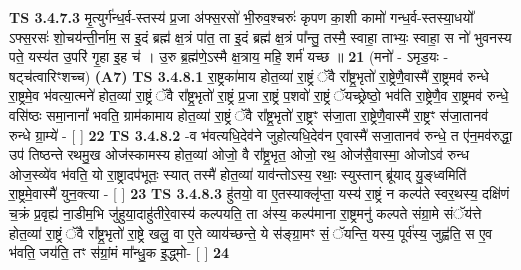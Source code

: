 \documentclass[17pt]{extarticle}
\begin{document}
                  \newline
                                \textbf{ TS 3.4.7.3} \newline
                  मृ॒त्युर्ग॑न्ध॒र्व-स्तस्य॑ प्र॒जा अ॑फ्स॒रसो॑ भी॒रुव॒श्चरुः॑ कृपण का॒शी कामो॑ गन्ध॒र्व-स्तस्या॒धयो᳚ ऽफ्स॒रसः॑ शो॒चय॑न्ती॒र्नाम॒ स इ॒दं ब्रह्म॑ क्ष॒त्रं पा॑त॒ ता इ॒दं ब्रह्म॑ क्ष॒त्रं पा᳚न्तु॒ तस्मै॒ स्वाहा॒ ताभ्यः॒ स्वाहा॒ स नो॑ भुवनस्य पते॒ यस्य॑त उ॒परि॑ गृ॒हा इ॒ह च॑ । उ॒रु ब्र॒ह्म॑णे॒ऽस्मै क्ष॒त्राय॒ महि॒ शर्म॑ यच्छ ॥ \textbf{  21} \newline
                  \newline
                      (मनो॑ - ऽमृड॒यः - षट्च॑त्वारिꣳशच्च)  \textbf{(A7)} \newline \newline
                                        \textbf{ TS 3.4.8.1} \newline
                  रा॒ष्ट्रका॑माय होत॒व्या॑ रा॒ष्ट्रं ॅवै रा᳚ष्ट्र॒भृतो॑ रा॒ष्ट्रेणै॒वास्मै॑ रा॒ष्ट्रमव॑ रुन्धे रा॒ष्ट्रमे॒व भ॑वत्या॒त्मने॑ होत॒व्या॑ रा॒ष्ट्रं ॅवै रा᳚ष्ट्र॒भृतो॑ रा॒ष्ट्रं प्र॒जा रा॒ष्ट्रं प॒शवो॑ रा॒ष्ट्रं ॅयच्छ्रेष्ठो॒ भव॑ति रा॒ष्ट्रेणै॒व रा॒ष्ट्रमव॑ रुन्धे॒ वसि॑ष्ठः समा॒नानां᳚ भवति॒ ग्राम॑कामाय होत॒व्या॑ रा॒ष्ट्रं ॅवै रा᳚ष्ट्र॒भृतो॑ रा॒ष्ट्रꣳ स॑जा॒ता रा॒ष्ट्रेणै॒वास्मै॑ रा॒ष्ट्रꣳ स॑जा॒तानव॑ रुन्धे ग्रा॒म्ये॑ - [  ] \textbf{  22} \newline
                  \newline
                                \textbf{ TS 3.4.8.2} \newline
                  -व भ॑वत्यधि॒देव॑ने जुहोत्यधि॒देव॑न ए॒वास्मै॑ सजा॒तानव॑ रुन्धे॒ त ए॑न॒मव॑रुद्धा॒ उप॑ तिष्ठन्ते रथमु॒ख ओज॑स्कामस्य होत॒व्या॑ ओजो॒ वै रा᳚ष्ट्र॒भृत॒ ओजो॒ रथ॒ ओज॑सै॒वास्मा॒ ओजोऽव॑ रुन्ध ओज॒स्व्ये॑व भ॑वति॒ यो रा॒ष्ट्रादप॑भूतः॒ स्यात् तस्मै॑ होत॒व्या॑ याव॑न्तोऽस्य॒ रथाः॒ स्युस्तान् ब्रू॑याद् यु॒ङ्ध्वमिति॑ रा॒ष्ट्रमे॒वास्मै॑ युन॒क्त्या - [  ] \textbf{  23} \newline
                  \newline
                                \textbf{ TS 3.4.8.3} \newline
                  हु॑तयो॒ वा ए॒तस्याक्लृ॑प्ता॒ यस्य॑ रा॒ष्ट्रं न कल्प॑ते स्वर॒थस्य॒ दक्षि॑णं च॒क्रं प्र॒वृह्य॑ ना॒डीम॒भि जु॑हुया॒दाहु॑तीरे॒वास्य॑ कल्पयति॒ ता अ॑स्य॒ कल्प॑माना रा॒ष्ट्रमनु॑ कल्पते संग्रा॒मे संॅय॑त्ते होत॒व्या॑ रा॒ष्ट्रं ॅवै रा᳚ष्ट्र॒भृतो॑ रा॒ष्ट्रे खलु॒ वा ए॒ते व्याय॑च्छन्ते॒ ये स॑ङ्ग्रा॒मꣳ सं॒ ॅयन्ति॒ यस्य॒ पूर्व॑स्य॒ जुह्व॑ति॒ स ए॒व भ॑वति॒ जय॑ति॒ तꣳ स॑ग्रां॒मं मा᳚न्धु॒क इ॒द्ध्मो- [  ] \textbf{  24} \newline
\end{document}

